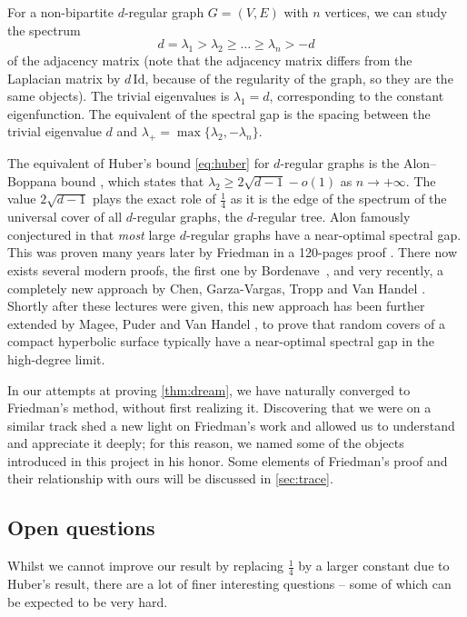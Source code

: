 \documentclass[12pt,twoside]{article}
\theoremstyle{theorem}
\theoremstyle{remark}
\theoremstyle{definition}
\theoremstyle{example}
\newcommand{\1}[1]{\mathds{1}_{#1}}
\begin{document}
For a non-bipartite $d$-regular graph $G=(V,E)$ with $n$ vertices, we can study the spectrum
\begin{equation}
  \label{eq:sp_A}
  d = \lambda_1 > \lambda_2 \geq \ldots \geq \lambda_n > -d
\end{equation}
of the adjacency matrix (note that the adjacency matrix differs from the Laplacian matrix by
$d \, \mathrm{Id}$, because of the regularity of the graph, so they are the same objects). The
trivial eigenvalues is $\lambda_1=d$, corresponding to the constant eigenfunction. The equivalent of
the spectral gap is the spacing between the trivial eigenvalue $d$ and
$\lambda_+=\max\{\lambda_2,-\lambda_n\}$.

The equivalent of Huber's bound \eqref{eq:huber} for $d$-regular graphs is the Alon--Boppana bound
\cite{nilli1991,alon1986}, which states that $\lambda_2 \geq 2 \sqrt{d-1}-o(1)$ as
$n \rightarrow + \infty$. The value $2 \sqrt{d-1}$ plays the exact role of $\frac 14$ as it is the
edge of the spectrum of the universal cover of all $d$-regular graphs, the $d$-regular tree. Alon
famously conjectured in \cite{alon1986} that \emph{most} large $d$-regular graphs have a
near-optimal spectral gap. This was proven many years later by Friedman in a 120-pages proof
\cite{friedman2003}. There now exists several modern proofs, the first one by
Bordenave~\cite{bordenave2020}, and very recently, a completely new approach by Chen, Garza-Vargas,
Tropp and Van Handel \cite{chen2025}. Shortly after these lectures were given, this new approach has
been further extended by Magee, Puder and Van Handel \cite{magee2025}, to prove that random covers
of a compact hyperbolic surface typically have a near-optimal spectral gap in the high-degree limit.

In our attempts at proving \cref{thm:dream}, we have naturally converged to Friedman's method,
without first realizing it. Discovering that we were on a similar track shed a new light on
Friedman's work and allowed us to understand and appreciate it deeply; for this reason, we named
some of the objects introduced in this project in his honor. Some elements of Friedman's proof and
their relationship with ours will be discussed in \cref{sec:trace}.

\subsection{Open questions}
\label{sec:open-questions}

Whilst we cannot improve our result by replacing $\frac 14$ by a larger constant due to Huber's
result, there are a lot of finer interesting questions -- some of which can be expected to be very hard.
\end{document}

